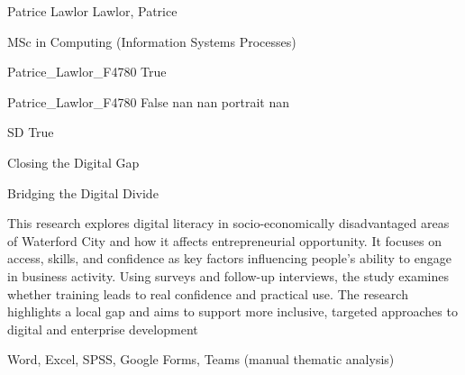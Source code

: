 
\begingroup{}\relax



\def\Key{Patrice_Lawlor_F4780}

{Patrice Lawlor}
{Lawlor, Patrice}

{MSc in Computing (Information Systems Processes)}

{Patrice_Lawlor_F4780}
{True}

{Patrice_Lawlor_F4780}
{False}
{nan}
{nan}
{portrait}
{nan}

{SD}
{True}

{Closing the Digital Gap}

{Bridging the Digital Divide}

{This research explores digital literacy in socio-economically disadvantaged areas of Waterford City and how it affects entrepreneurial opportunity. It focuses on access, skills, and confidence as key factors influencing people's ability to engage in business activity. Using surveys and follow-up interviews, the study examines whether training leads to real confidence and practical use. The research highlights a local gap and aims to support more inclusive, targeted approaches to digital and enterprise development}

{Word, Excel, SPSS, Google Forms, Teams (manual thematic analysis)}

